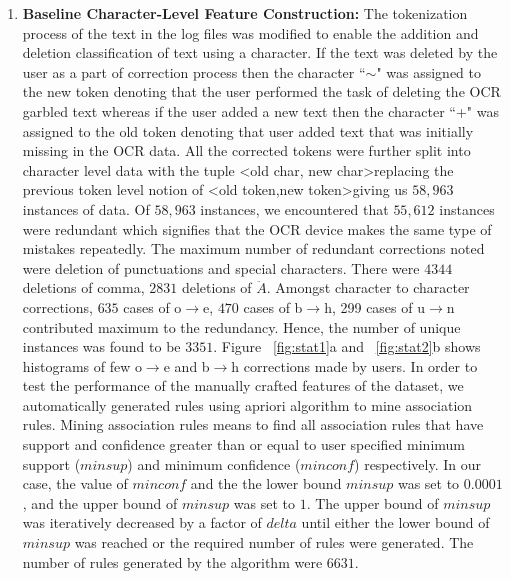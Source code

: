 \documentclass{sig-alternate}
\begin{document}
\begin{enumerate}
\item \textbf{Baseline Character-Level Feature Construction: }
The tokenization process of the text in the log files was modified to enable the addition and deletion classification of text using a character. If the text was deleted by the user as a part of correction process then the character ``$\sim$" was assigned to the new token denoting that the user performed the task of deleting the OCR garbled text whereas if the user added a new text  then the character ``+" was assigned to the old token denoting that user added text that was initially missing in the OCR data. All the corrected tokens were further split into character level data with the tuple \textless old char, new char\textgreater  replacing the previous token level notion of \textless old token,new token\textgreater giving us $58,963$ instances of data. Of $58,963$ instances, we encountered that $55,612$ instances were redundant which signifies that the OCR device makes the same type of mistakes repeatedly. The maximum number of redundant corrections noted were deletion of punctuations and special characters. There were $4344$ deletions of comma, $2831$ deletions of $\ddot{A}$. Amongst character to character corrections, $635$ cases of o$\rightarrow$e, $470$ cases of b$\rightarrow$h, 299 cases of u$\rightarrow$n contributed maximum to the redundancy. Hence, the number of unique instances was found to be $3351$. Figure ~\ref{fig:stat1}a and ~\ref{fig:stat2}b shows histograms of few o$\rightarrow$e and b$\rightarrow$h corrections made by users. In order to test the performance of the manually crafted features of the dataset, we automatically generated rules using apriori algorithm to mine association rules. Mining association rules means to find all association rules that have support and confidence greater than or equal to user specified minimum support ($minsup$) and minimum confidence ($minconf$) respectively. In our case, the value of $minconf$ and the the lower bound $minsup$ was set to $0.0001$, and the upper bound of $minsup$ was set to $1$. The upper bound of $minsup$ was iteratively decreased by a factor of $delta$ until either the lower bound of $minsup$ was reached or the required number of rules were generated. The number of rules generated by the algorithm were $6631$.


\end{enumerate}
\end{document}
